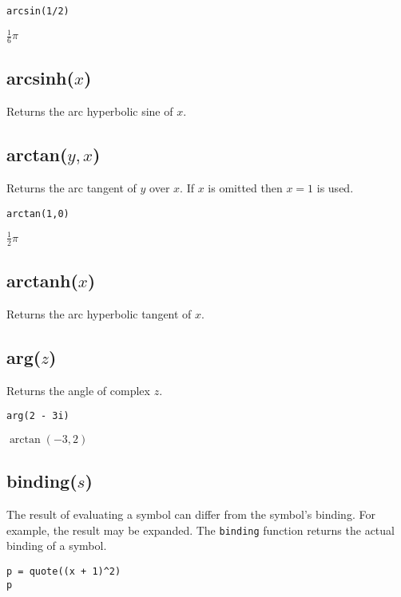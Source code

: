\documentclass[12pt]{article}
\begin{document}
{\color{blue}
\begin{verbatim}
arcsin(1/2)
\end{verbatim}
}

\noindent
$\tfrac{1}{6}\pi$

\subsection*{arcsinh($x$)}

Returns the arc hyperbolic sine of $x$.

\subsection*{arctan($y,x$)}

Returns the arc tangent of $y$ over $x$.
If $x$ is omitted then $x=1$ is used.

{\color{blue}
\begin{verbatim}
arctan(1,0)
\end{verbatim}
}

\noindent
$\tfrac{1}{2}\pi$

\subsection*{arctanh($x$)}

Returns the arc hyperbolic tangent of $x$.

\subsection*{arg($z$)}

Returns the angle of complex $z$.

{\color{blue}
\begin{verbatim}
arg(2 - 3i)
\end{verbatim}
}

\noindent
$\arctan(-3,2)$

\subsection*{binding($s$)}

The result of evaluating a symbol can differ from the symbol's binding.
For example, the result may be expanded.
The {\tt binding} function returns the actual binding of a symbol.

{\color{blue}
\begin{verbatim}
p = quote((x + 1)^2)
p
\end{verbatim}
}
\end{document}
